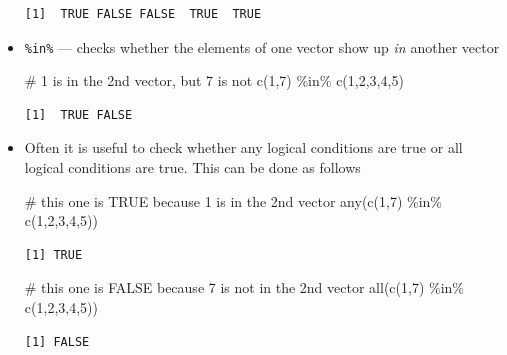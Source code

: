 \documentclass[
  letterpaper,
  DIV=11,
  numbers=noendperiod]{scrreprt}
\newenvironment{Shaded}{\begin{snugshade}}{\end{snugshade}}
\newcommand{\CommentTok}[1]{\textcolor[rgb]{0.37,0.37,0.37}{#1}}
\newcommand{\DecValTok}[1]{\textcolor[rgb]{0.68,0.00,0.00}{#1}}
\newcommand{\FunctionTok}[1]{\textcolor[rgb]{0.28,0.35,0.67}{#1}}
\newcommand{\NormalTok}[1]{\textcolor[rgb]{0.00,0.23,0.31}{#1}}
\newcommand{\SpecialCharTok}[1]{\textcolor[rgb]{0.37,0.37,0.37}{#1}}
\begin{document}
\begin{itemize}
\begin{verbatim}
[1]  TRUE FALSE FALSE  TRUE  TRUE
\end{verbatim}
\item
  \texttt{\%in\%} --- checks whether the elements of one vector show up
  \emph{in} another vector

\begin{Shaded}
\begin{Highlighting}[]
\CommentTok{\# 1 is in the 2nd vector, but 7 is not}
\FunctionTok{c}\NormalTok{(}\DecValTok{1}\NormalTok{,}\DecValTok{7}\NormalTok{) }\SpecialCharTok{\%in\%} \FunctionTok{c}\NormalTok{(}\DecValTok{1}\NormalTok{,}\DecValTok{2}\NormalTok{,}\DecValTok{3}\NormalTok{,}\DecValTok{4}\NormalTok{,}\DecValTok{5}\NormalTok{)}
\end{Highlighting}
\end{Shaded}

\begin{verbatim}
[1]  TRUE FALSE
\end{verbatim}
\item
  Often it is useful to check whether any logical conditions are true or
  all logical conditions are true. This can be done as follows

\begin{Shaded}
\begin{Highlighting}[]
\CommentTok{\# this one is TRUE because 1 is in the 2nd vector  }
\FunctionTok{any}\NormalTok{(}\FunctionTok{c}\NormalTok{(}\DecValTok{1}\NormalTok{,}\DecValTok{7}\NormalTok{) }\SpecialCharTok{\%in\%} \FunctionTok{c}\NormalTok{(}\DecValTok{1}\NormalTok{,}\DecValTok{2}\NormalTok{,}\DecValTok{3}\NormalTok{,}\DecValTok{4}\NormalTok{,}\DecValTok{5}\NormalTok{))}
\end{Highlighting}
\end{Shaded}

\begin{verbatim}
[1] TRUE
\end{verbatim}

\begin{Shaded}
\begin{Highlighting}[]
\CommentTok{\# this one is FALSE because 7 is not in the 2nd vector}
\FunctionTok{all}\NormalTok{(}\FunctionTok{c}\NormalTok{(}\DecValTok{1}\NormalTok{,}\DecValTok{7}\NormalTok{) }\SpecialCharTok{\%in\%} \FunctionTok{c}\NormalTok{(}\DecValTok{1}\NormalTok{,}\DecValTok{2}\NormalTok{,}\DecValTok{3}\NormalTok{,}\DecValTok{4}\NormalTok{,}\DecValTok{5}\NormalTok{))}
\end{Highlighting}
\end{Shaded}

\begin{verbatim}
[1] FALSE
\end{verbatim}
\end{itemize}
\end{document}
